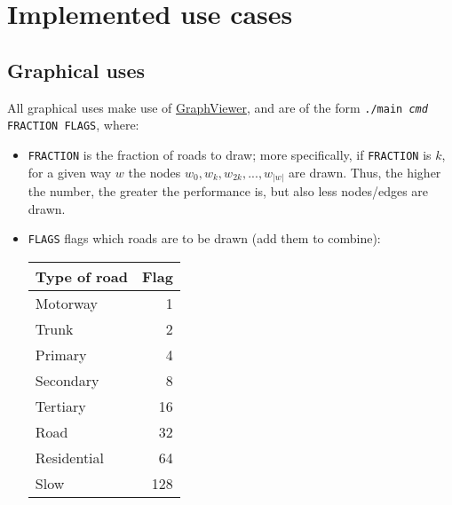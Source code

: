 \chapter{Implemented use cases} \label{implemented-use-cases}
\section{Graphical uses}
All graphical uses make use of \href{https://github.com/STEMS-group/GraphViewer}{GraphViewer}, and are of the form \texttt{./main \textit{cmd} FRACTION FLAGS}, where:
\begin{itemize}
    \item \texttt{FRACTION} is the fraction of roads to draw; more specifically, if \texttt{FRACTION} is $k$, for a given way $w$ the nodes $w_0, w_k, w_{2k},...,w_{|w|}$ are drawn. Thus, the higher the number, the greater the performance is, but also less nodes/edges are drawn.
    \item \texttt{FLAGS} flags which roads are to be drawn (add them to combine):
    \begin{center}
        \begin{tabular}{l | r}
            \textbf{Type of road} & \textbf{Flag} \\ \hline
            Motorway     &    1 \\
            Trunk        &    2 \\
            Primary      &    4 \\
            Secondary    &    8 \\
            Tertiary     &   16 \\
            Road         &   32 \\
            Residential  &   64 \\
            Slow         &  128
        \end{tabular}
    \end{center}
\end{itemize}
